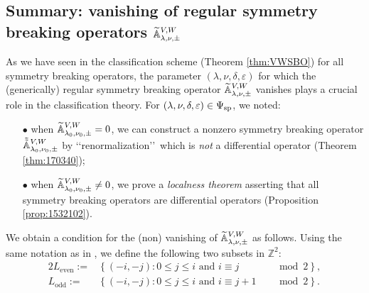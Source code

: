 \subsection{Summary: vanishing of regular 
 symmetry breaking operators ${\widetilde{\mathbb{A}}}_{{\lambda},{\nu},{\pm}}^{{V,W}}$}
\label{subsec:vanAVW}
As we have seen in the classification scheme
 (Theorem \ref{thm:VWSBO}) 
 for all symmetry breaking operators, 
 the parameter $(\lambda,\nu,\delta,\varepsilon)$ 
 for which the (generically) regular symmetry breaking operator
 ${\widetilde{\mathbb{A}}}_{{\lambda},{\nu},{\pm}}^{{V,W}}$
 vanishes plays a crucial role
 in the classification theory.  
For $(\lambda,\nu,\delta,\varepsilon) \in \Psi_{{\operatorname{sp}}}$, 
 we noted:
\begin{enumerate}
\item[$\bullet$]
when ${\widetilde{\mathbb{A}}}_{{\lambda_0},{\nu_0},{\pm}}^{{V, W}}=0$, 
 we can construct a nonzero symmetry breaking operator
 $\tilde{\tilde{{\mathbb{A}}}}_{{\lambda_0},{\nu_0},{\pm}}^{{V, W}}$
 by \lq\lq{renormalization}\rq\rq\
 which is {\it{not}} a differential operator
 (Theorem \ref{thm:170340});
\item[$\bullet$]
when ${\widetilde{\mathbb{A}}}_{{\lambda_0},{\nu_0},{\pm}}^{{V, W}}\ne 0$, 
we prove a 
 {\it{localness theorem}}
 asserting
 that all symmetry breaking operators are differential operators
 (Proposition \ref{prop:1532102}).  
\end{enumerate}



We obtain a condition 
 for the (non) vanishing of ${\widetilde{\mathbb{A}}}_{{\lambda},{\nu},{\pm}}^{{V, W}}$
 as follows.  
Using the same notation
 as in \cite[Chap.~1]{sbon}, 
 we define the following two subsets in ${\mathbb{Z}}^2$:
\begin{alignat}{2}
\label{eqn:Leven}
L_{\operatorname{even}}:=
&\left\{ \right.
 (-i,-j):
0 \le j\leq i \mbox{ and } i\equiv j 
&& \mod 2 \left. \right \},
\\
\label{eqn:Lodd}
L_{\operatorname{odd}}:=
&\left\{ \right.
  (-i,-j)
: 0 \le j\leq i \mbox{ and } i \equiv j +1 
&& \mod 2 \left. \right \}.
\end{alignat}

